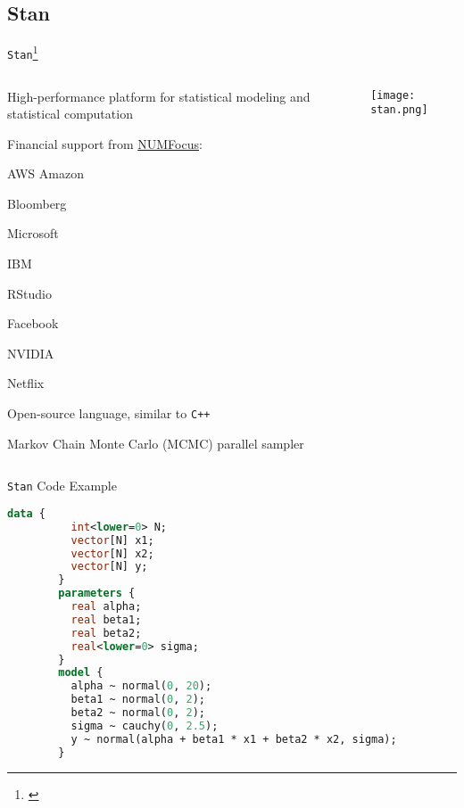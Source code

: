 \subsection{Stan}
\begin{frame}{\texttt{Stan}\footnote{\textcite{carpenterStanProbabilisticProgramming2017}}}
	\begin{columns}
		\begin{column}{0.8\textwidth}
			\begin{vfilleditems}
				\small
				\item High-performance platform for statistical
				modeling and  statistical computation
				\item Financial support from
				\href{https://numfocus.org/}{NUMFocus}:
				\begin{vfilleditems}
					\footnotesize
					\item AWS Amazon
					\item Bloomberg
					\item Microsoft
					\item IBM
					\item RStudio
					\item Facebook
					\item NVIDIA
					\item Netflix
				\end{vfilleditems}
				\small
				\item Open-source language, similar to \texttt{C++}
				\item Markov Chain Monte Carlo (MCMC) parallel sampler
			\end{vfilleditems}
		\end{column}
		\begin{column}{0.2\textwidth}
			\centering
			\texttt{[image: stan.png]}
		\end{column}
	\end{columns}
\end{frame}

\begin{frame}[fragile]{\texttt{Stan} Code Example}
	\begin{lstlisting}[basicstyle=\footnotesize, language=Stan]
        data {
          int<lower=0> N;
          vector[N] x1;
          vector[N] x2;
          vector[N] y;
        }
        parameters {
          real alpha;
          real beta1;
          real beta2;
          real<lower=0> sigma;
        }
        model {
          alpha ~ normal(0, 20);
          beta1 ~ normal(0, 2);
          beta2 ~ normal(0, 2);
          sigma ~ cauchy(0, 2.5);
          y ~ normal(alpha + beta1 * x1 + beta2 * x2, sigma);
        }
    \end{lstlisting}
\end{frame}

